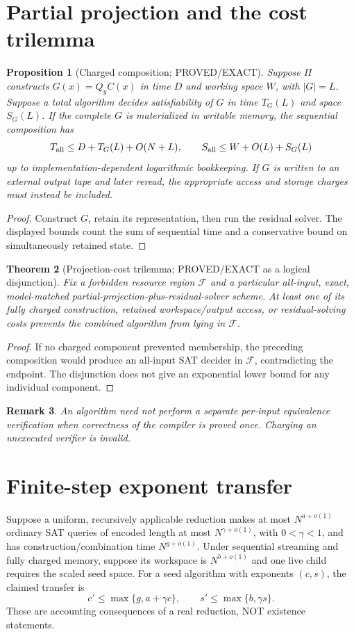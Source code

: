\documentclass[11pt]{article}
\newtheorem{theorem}{Theorem}[section]
\newtheorem{proposition}[theorem]{Proposition}
\newtheorem{remark}[theorem]{Remark}
\begin{document}
\section{Partial projection and the cost trilemma}
\begin{proposition}[Charged composition; PROVED/EXACT]
Suppose $\Pi$ constructs $G(x)=Q_yC(x)$ in time $D$ and working space
$W$, with $|G|=L$. Suppose a total algorithm decides satisfiability
of $G$ in time $T_G(L)$ and space $S_G(L)$. If the complete $G$ is
materialized in writable memory, the sequential composition has
\[
T_{\rm all}\le D+T_G(L)+O(N+L),\qquad
S_{\rm all}\le W+O(L)+S_G(L)
\]
up to implementation-dependent logarithmic bookkeeping.
If $G$ is written to an external output tape and later reread,
the appropriate access and storage charges must instead be included.
\end{proposition}
\begin{proof}
Construct $G$, retain its representation, then run the residual
solver. The displayed bounds count the sum of sequential time and
a conservative bound on simultaneously retained state.
\end{proof}
\begin{theorem}[Projection-cost trilemma; PROVED/EXACT as a logical
disjunction]
Fix a forbidden resource region $\mathcal F$ and a particular
all-input, exact, model-matched partial-projection-plus-residual-solver
scheme. At least one of its fully charged construction, retained
workspace/output access, or residual-solving costs prevents the
\emph{combined} algorithm from lying in $\mathcal F$.
\end{theorem}
\begin{proof}
If no charged component prevented membership, the preceding
composition would produce an all-input SAT decider in $\mathcal F$,
contradicting the endpoint. The disjunction does not give an
exponential lower bound for any individual component.
\end{proof}
\begin{remark}
An algorithm need not perform a separate per-input equivalence
verification when correctness of the compiler is proved once.
Charging an unexecuted verifier is invalid.
\end{remark}

\section{Finite-step exponent transfer}
Suppose a uniform, recursively applicable reduction makes at most
$N^{a+o(1)}$ ordinary SAT queries of encoded length at most
$N^{\gamma+o(1)}$, with $0<\gamma<1$, and has construction/combination
time $N^{g+o(1)}$. Under sequential streaming and fully charged
memory, suppose its workspace is $N^{b+o(1)}$ and one live child
requires the scaled seed space. For a seed algorithm with exponents
$(c,s)$, the claimed transfer is
\[
c'\le\max\{g,a+\gamma c\},\qquad
s'\le\max\{b,\gamma s\}.
\]
These are accounting consequences of a real reduction, NOT existence
statements.
\end{document}
